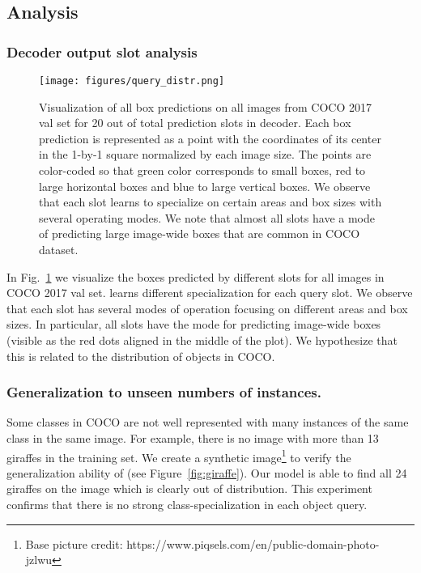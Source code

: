 \subsection{Analysis}
\subsubsection{Decoder output slot analysis}

\begin{figure}[t]
    \centering
    \texttt{[image: figures/query\_distr.png]}
    \caption{
    Visualization of all box predictions on all images from COCO 2017 val set for 20 out of total  prediction slots in \detr decoder. Each box prediction is represented as a point with the coordinates of its center in the 1-by-1 square normalized by each image size. The points are color-coded so that green color corresponds to small boxes, red to large horizontal boxes and blue to large vertical boxes. We observe that each slot learns to specialize on certain areas and box sizes with several operating modes. We note that almost all slots have a mode of predicting large image-wide boxes that are common in COCO dataset.
    }
    \label{fig:queries}
\end{figure}

In Fig.~\ref{fig:queries} we visualize the boxes predicted by different slots for
all images in COCO 2017 val set. \detr learns different specialization for each
query slot. We observe that each slot has several modes of operation focusing on
different areas and box sizes. In particular, all slots have the mode for
predicting image-wide boxes (visible as the red dots aligned in the middle of
the plot). We hypothesize that this is related to the distribution of objects in COCO.
\subsubsection{Generalization to unseen numbers of instances.}
Some classes in COCO are not well represented with many instances of the same class in the same image. For example, there is no image with more than 13 giraffes in the training set. We create a synthetic image\footnote{Base picture credit: https://www.piqsels.com/en/public-domain-photo-jzlwu} to verify the generalization ability of \detr (see Figure~\ref{fig:giraffe}). Our model is able to find all 24 giraffes on the image which is clearly out of distribution. This experiment confirms that there is no strong class-specialization in each object query.



